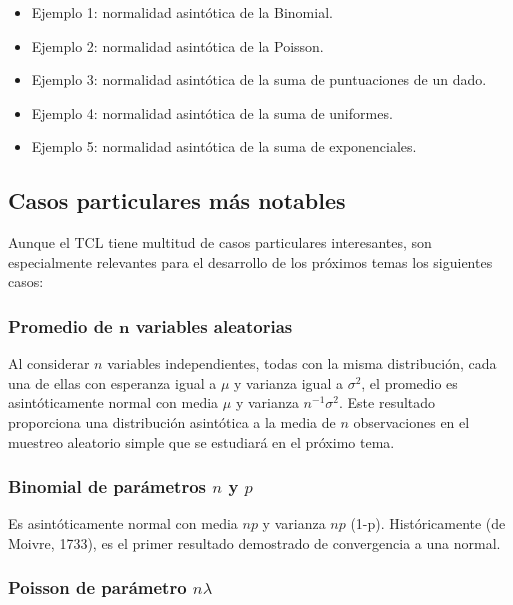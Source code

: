 \documentclass[
  a4paper,
  DIV=11,
  numbers=noendperiod]{scrreprt}
\providecommand{\tightlist}{%
  \setlength{\itemsep}{0pt}\setlength{\parskip}{0pt}}\usepackage{longtable,booktabs,array}
\begin{document}
\begin{itemize}
\tightlist
\item
  Ejemplo 1: normalidad asintótica de la Binomial.
\item
  Ejemplo 2: normalidad asintótica de la Poisson.
\item
  Ejemplo 3: normalidad asintótica de la suma de puntuaciones de un
  dado.
\item
  Ejemplo 4: normalidad asintótica de la suma de uniformes.
\item
  Ejemplo 5: normalidad asintótica de la suma de exponenciales.
\end{itemize}

\subsection{Casos particulares más
notables}\label{casos-particulares-muxe1s-notables}

Aunque el TCL tiene multitud de casos particulares interesantes, son
especialmente relevantes para el desarrollo de los próximos temas los
siguientes casos:

\subsubsection{\texorpdfstring{Promedio de \(\boldsymbol{n}\) variables
aleatorias}{Promedio de \textbackslash boldsymbol\{n\} variables aleatorias}}\label{promedio-de-boldsymboln-variables-aleatorias}

Al considerar \(n\) variables independientes, todas con la misma
distribución, cada una de ellas con esperanza igual a \(\mu\) y varianza
igual a \(\sigma^{2}\), el promedio es asintóticamente normal con media
\(\mu\) y varianza \(n^{-1} \sigma^{2}\). Este resultado proporciona una
distribución asintótica a la media de \(n\) observaciones en el muestreo
aleatorio simple que se estudiará en el próximo tema.

\subsubsection{\texorpdfstring{Binomial de parámetros \(n\) y
\(p\)}{Binomial de parámetros n y p}}\label{binomial-de-paruxe1metros-n-y-p}

Es asintóticamente normal con media \(n p\) y varianza \(n p\) (1-p).
Históricamente (de Moivre, 1733), es el primer resultado demostrado de
convergencia a una normal.

\subsubsection{\texorpdfstring{Poisson de parámetro
\(n \lambda\)}{Poisson de parámetro n \textbackslash lambda}}\label{poisson-de-paruxe1metro-n-lambda}
\end{document}
